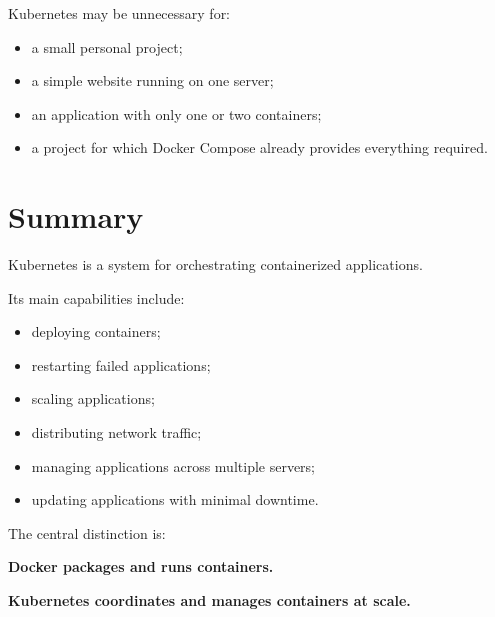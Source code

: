 \documentclass[a4paper]{article}
\begin{document}
        Kubernetes may be unnecessary for:
        
        \begin{itemize}
            \item a small personal project;
            \item a simple website running on one server;
            \item an application with only one or two containers;
            \item a project for which Docker Compose already provides everything
            required.
        \end{itemize}
    
    
    \section{Summary}
        
        Kubernetes is a system for orchestrating containerized applications.
        
        Its main capabilities include:
        
        \begin{itemize}
            \item deploying containers;
            \item restarting failed applications;
            \item scaling applications;
            \item distributing network traffic;
            \item managing applications across multiple servers;
            \item updating applications with minimal downtime.
        \end{itemize}
        
        The central distinction is:
        
        \begin{tcolorbox}[
            enhanced,
            colback=green!5,
            colframe=green!45!black
        ]
            \centering
            
            \textbf{Docker packages and runs containers.}
            
            \medskip
            
            \textbf{Kubernetes coordinates and manages containers at scale.}
        \end{tcolorbox}

% 
% 
\end{document}
